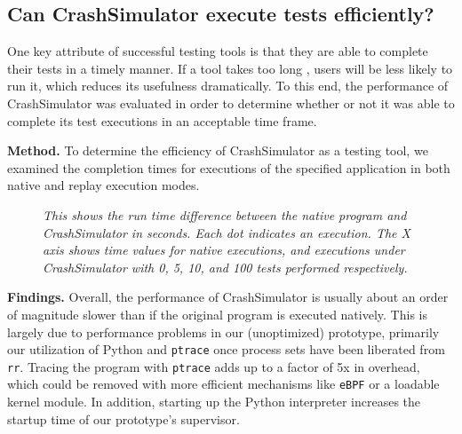\subsection{Can CrashSimulator execute tests efficiently?}
\label{sec-perf}


One key attribute of successful testing tools is that they are able to
complete their tests in a timely manner.  If a tool takes too long
, users will be less likely to run it, which reduces its
usefulness dramatically. To this end, the performance of CrashSimulator was
evaluated in order to determine whether or not it was able to complete its
test executions in an acceptable time frame.

{\bf Method.} To determine the efficiency of CrashSimulator as a testing tool,
we examined the completion
times for executions of the specified application in both
native and replay execution modes.


    \begin{figure}[t]
        \center{}
        \caption{\emph{This shows the run time difference between the
native program and CrashSimulator in seconds.  Each dot indicates an
        execution.  The X axis shows time values for native executions, and
        executions under CrashSimulator with 0, 5, 10, and 100 tests
        performed respectively.
}}
         \label{figure:performance}

    \end{figure}


{\bf Findings.} Overall, the performance of CrashSimulator is usually
about an order of magnitude slower than if the original program is executed
natively.  This is largely due to performance problems in our (unoptimized)
prototype, primarily our utilization of Python and {\tt ptrace} once
process sets have been liberated from {\tt rr}.  Tracing the program
with {\tt ptrace} adds up to a factor of 5x in overhead,  which could be
removed with more efficient mechanisms like {\tt eBPF} or a loadable kernel
module.  In addition, starting up the Python interpreter increases the
startup time of our prototype's supervisor.

